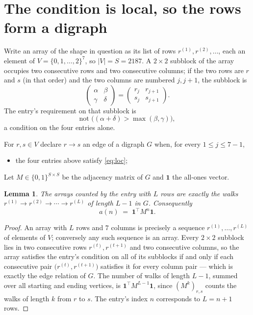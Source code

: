 \documentclass[11pt,a4paper]{article}
\theoremstyle{plain}
\newtheorem{lemma}[theorem]{Lemma}
\theoremstyle{definition}
\begin{document}
\section{The condition is local, so the rows form a digraph}

Write an array of the shape in question as its list of rows
$r^{(1)},r^{(2)},\dots$, each an element of
$V=\{0,1,\dots,2\}^{7}$, so $|V|=S=2187$. A $2\times2$ subblock of the array
occupies two consecutive rows and two consecutive columns; if the two rows are $r$
and $s$ (in that order) and the two columns are numbered $j,j+1$,
the subblock is
\[
\begin{pmatrix}\alpha&\beta\\\gamma&\delta\end{pmatrix}=\begin{pmatrix}r_j&r_{j+1}\\s_j&s_{j+1}\end{pmatrix}.
\]
The entry's requirement on that subblock is
\begin{equation}\label{eq:loc}
\text{not }\bigl((\alpha+\delta)>\max(\beta,\gamma)\bigr),
\end{equation}
a condition on the four entries alone.

For $r,s\in V$ declare $r\to s$ an edge of a digraph $G$ when, for every
$1\le j\le 7-1$,
\begin{itemize}
\item the four entries above satisfy \eqref{eq:loc};

\end{itemize}
Let $M\in\{0,1\}^{S\times S}$ be the adjacency matrix of $G$ and $\mathbf{1}$ the
all-ones vector.

\begin{lemma}\label{lem:walk}
The arrays counted by the entry with $L$ rows are exactly the walks
$r^{(1)}\to r^{(2)}\to\cdots\to r^{(L)}$ of length $L-1$ in $G$. Consequently
\[
a(n)\;=\;\mathbf{1}^{\!\top}M^{n}\mathbf{1} .
\]
\end{lemma}

\begin{proof}
An array with $L$ rows and $7$ columns is precisely a sequence
$r^{(1)},\dots,r^{(L)}$ of elements of $V$; conversely any such sequence is an array.
Every $2\times2$ subblock lies in two consecutive rows $r^{(t)},r^{(t+1)}$ and two
consecutive columns, so the array satisfies the entry's condition on all of its subblocks
if and only if each consecutive pair $\bigl(r^{(t)},r^{(t+1)}\bigr)$ satisfies it for
every column pair --- which is exactly the edge relation of $G$. The number of walks of
length $L-1$, summed over all starting and ending vertices, is
$\mathbf{1}^{\!\top}M^{L-1}\mathbf{1}$, since $(M^{k})_{r,s}$ counts the walks of
length $k$ from $r$ to $s$. The entry's index $n$ corresponds to $L=n+1$ rows.
\end{proof}
\end{document}
